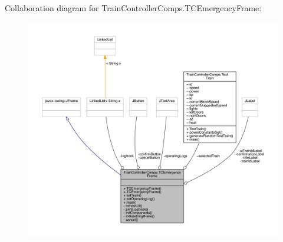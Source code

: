 Collaboration diagram for Train\+Controller\+Comps.\+T\+C\+Emergency\+Frame\+:
\nopagebreak
\begin{figure}[H]
\begin{center}
\leavevmode
\includegraphics[width=350pt]{classTrainControllerComps_1_1TCEmergencyFrame__coll__graph}
\end{center}
\end{figure}
